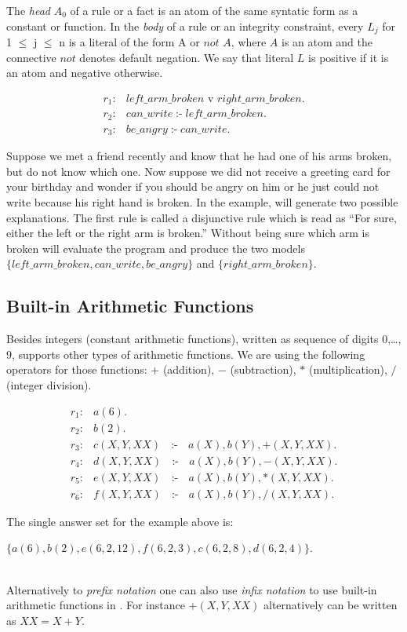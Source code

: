 \documentclass[14pt,a4paper, titlepage]{article}
\DeclareMathOperator{\leftimpl}{:-}
\begin{document}
The \emph{head} $A_0$ of a rule or a fact is an atom of the same syntatic form as a constant or function. In the \emph{body} of a rule or an integrity constraint, every $L_j$ for 1 $\leq$ j $\leq$ n is a literal of the form A or $\mathit{not}$ \text{}$A$, where $A$ is an atom and the connective $\mathit{not}$ denotes default negation. We say that literal $L$ is positive if it is an atom and negative otherwise. 
\begin{exmp}
\begin{align*}
r_1\colon& \mathit{left\_arm\_broken} \text{ v } \mathit{right\_arm\_broken}.\\
r_2\colon& \mathit{can\_write} \leftimpl \mathit{left\_arm\_broken}.\\
r_3\colon& \mathit{be\_angry} \leftimpl \mathit{can\_write}.
\end{align*}
\end{exmp}
Suppose we met a friend recently and know that he had one of his arms broken, but do not know which one. Now suppose we did not receive a greeting card for your birthday and wonder if you should be angry on him or he just could not write because his right hand is broken. In the example, \dlvhex{} will generate two possible explanations. The first rule is called a disjunctive rule which is read as \enquote{For sure, either the left or the right arm is broken.} Without being sure which arm is broken \dlvhex{} will evaluate the program and produce the two models $\mathit{\{left\_arm\_broken, can\_write, be\_angry\}}$ and $\mathit{\{right\_arm\_broken\}}$.  

\subsection{Built-in Arithmetic Functions}
Besides integers (constant arithmetic functions), written as sequence of digits $0$,\dots,$9$, \dlvhex{} supports other types of arithmetic functions. We are using the following operators for those functions: $+$ (addition), $-$ (subtraction), $*$ (multiplication), $/$ (integer division). 
\begin{exmp}
\begin{align*}
r_1\colon& \mathit{a}(6). \\
r_2\colon& \mathit{b}(2). \\
r_3\colon& c(X,Y,XX) \text{ } \leftimpl \text{ } a(X), b(Y),+(X, Y, XX). \\
r_4\colon& d(X,Y,XX) \text{ } \leftimpl \text{ } a(X), b(Y),-(X, Y, XX). \\
r_5\colon& e(X,Y,XX) \text{ } \leftimpl \text{ } a(X), b(Y),*(X, Y, XX). \\
r_6\colon& f(X,Y,XX) \text{ } \leftimpl \text{ } a(X), b(Y),/(X, Y, XX).
\end{align*}
\end{exmp}
The single answer set for the example above is:\\ \centerline{$\mathit{\{a(6),b(2),e(6,2,12),f(6,2,3),c(6,2,8),d(6,2,4)\}}$.}
\\Alternatively to \emph{prefix notation} one can also use \emph{infix notation} to use built-in arithmetic functions in \dlvhex{}. For instance $\mathit{+(X, Y, XX)}$ alternatively can be written as $\mathit{XX=X+Y}$. 
\end{document}
